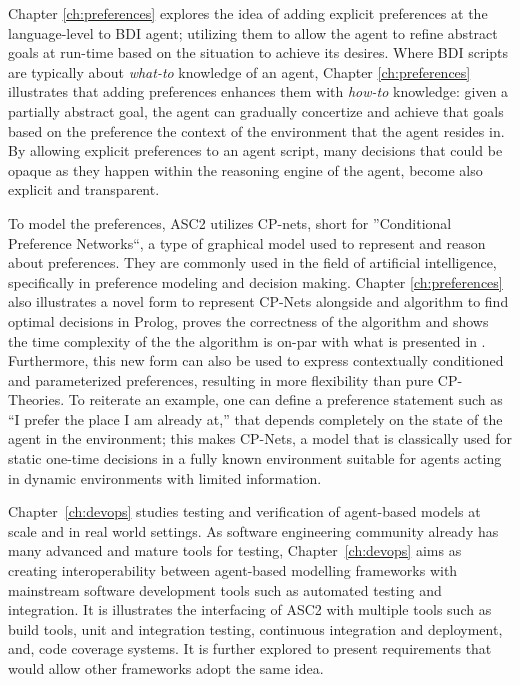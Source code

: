 Chapter \ref{ch:preferences} explores the idea of adding explicit preferences at the language-level to BDI agent; utilizing them to allow the agent to refine abstract goals at run-time based on the situation to achieve its desires. Where BDI scripts are typically about \textit{what-to} knowledge of an agent, Chapter \ref{ch:preferences} illustrates that adding preferences enhances them with \textit{how-to} knowledge: given a partially abstract goal, the agent can gradually concertize and achieve that goals based on the preference the context of the environment that the agent resides in. By allowing explicit preferences to an agent script, many decisions that could be opaque as they happen within the reasoning engine of the agent, become also explicit and transparent. 

To model the preferences, ASC2 utilizes CP-nets, short for ''Conditional Preference Networks``, a type of graphical model used to represent and reason about preferences. They are commonly used in the field of artificial intelligence, specifically in preference modeling and decision making. Chapter \ref{ch:preferences} also illustrates a novel form to represent CP-Nets alongside and algorithm to find optimal decisions in Prolog, proves the correctness of the algorithm and shows the time complexity of the the algorithm is on-par with what is presented in \cite{Boutilier2004}. Furthermore, this new form can also be used to express contextually conditioned and parameterized preferences, resulting in more flexibility than pure CP-Theories. To reiterate an example, one can define a preference statement such as ``I prefer the place I am already at,'' that depends completely on the state of the agent in the environment; this makes CP-Nets, a model that is classically used for static one-time decisions in a fully known environment suitable for agents acting in dynamic environments with limited information.


Chapter~\ref{ch:devops} studies testing and verification of agent-based models at scale and in real world settings. As software engineering community already has many advanced and mature tools for testing, Chapter~\ref{ch:devops} aims as creating interoperability between agent-based modelling frameworks with mainstream software development tools such as automated testing and integration. It is illustrates the interfacing of ASC2 with multiple tools such as build tools, unit and integration testing,  continuous integration and deployment, and, code coverage systems. It is further explored to present requirements that would allow other frameworks adopt the same idea.

